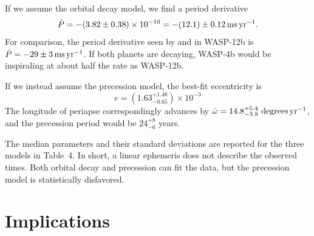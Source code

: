 \documentclass[12pt,twocolumn,tighten]{aastex62}
\begin{document}
If we assume the orbital decay model, we find a period derivative 
\begin{equation}
\dot{P}
  = - (3.82 \pm 0.38)\times 10^{-10}
  = - (12.1) \pm 0.12\,{\rm ms}\,{\rm yr}^{-1}.
  \label{eq:dP_dt_obs}
\end{equation}
For comparison, the period derivative seen by
\citet{maciejewski_departure_2016} and \citet{patra_2017} in WASP-12b
is $\dot{P} = -29 \pm 3\,{\rm ms}\,{\rm yr}^{-1}$.  If both planets
are decaying, WASP-4b would be inspiraling at about half the rate as
WASP-12b.

If we instead assume the precession model, the best-fit eccentricity
is
\begin{equation}
  e = (1.63^{+ 1.48}_{- 0.65})\times10^{-3}
\end{equation}
The longitude of periapse correspondingly advances by $\dot{\omega}
= 14.8^{+5.4}_{-3.8}\ {\rm degrees}\,{\rm yr}^{-1}$, and the
precession period would be $24^{+8}_{-6}$ years.

The median parameters and their standard deviations are reported for
the three models in Table~4.  In short, a linear ephemeris does not
describe the observed times.  Both orbital decay and precession can
fit the data, but the precession model is statistically disfavored.


\section{Implications}
\label{sec:implications}
\end{document}
